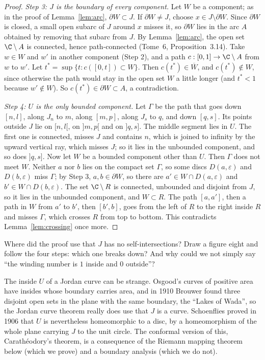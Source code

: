 \begin{proof}
\emph{Step 3: $J$ is the boundary of every component.} Let $W$ be a component; as in the proof of Lemma~\ref{lem:arc}, $\partial W\subset J$. If $\partial W\ne J$, choose $x\in J\setminus\partial W$.
Since $\partial W$ is closed, a small open subarc of $J$ around $x$ misses it, so $\partial W$ lies in the arc $A$ obtained by removing that subarc from $J$. By Lemma~\ref{lem:arc}, the open set
$\C\setminus A$ is connected, hence path-connected (Tome~6, Proposition~3.14). Take $w\in W$ and $w'$ in another component (Step 2), and a path $c:[0,1]\to\C\setminus A$ from $w$ to $w'$. Let
$t^*=\sup\{t:c([0,t])\subset W\}$. Then $c(t^*)\in\overline W$, and $c(t^*)\notin W$, since otherwise the path would stay in the open set $W$ a little longer (and $t^*<1$ because $w'\notin W$). So
$c(t^*)\in\partial W\subset A$, a contradiction.

\emph{Step 4: $U$ is the only bounded component.} Let $\Gamma$ be the path that goes down $[n,l]$, along $J_n$ to $m$, along $[m,p]$, along $J_s$ to $q$, and down $[q,s]$. Its points outside $J$
lie on $[n,l[$, on $]m,p[$ and on $]q,s]$. The middle segment lies in $U$. The first one is connected, misses $J$ and contains $n$, which is joined to infinity by the upward vertical ray, which misses
$J$; so it lies in the unbounded component, and so does $]q,s]$. Now let $W$ be a bounded component other than $U$. Then $\Gamma$ does not meet $W$. Neither $a$ nor $b$ lies on the compact
set $\Gamma$, so some discs $D(a,\varepsilon)$ and $D(b,\varepsilon)$ miss $\Gamma$; by Step 3, $a,b\in\partial W$, so there are $a'\in W\cap D(a,\varepsilon)$ and $b'\in W\cap D(b,\varepsilon)$. The set $\C\setminus R$ is
connected, unbounded and disjoint from $J$, so it lies in the unbounded component, and $W\subset R$. The path $[a,a']$, then a path in $W$ from $a'$ to $b'$, then $[b',b]$, goes from the left of
$R$ to the right inside $R$ and misses $\Gamma$, which crosses $R$ from top to bottom. This contradicts Lemma~\ref{lem:crossing} once more.
\end{proof}

\begin{think}
Where did the proof use that $J$ has no self-intersections? Draw a figure eight and follow the four steps: which one breaks down? And why could we not simply say ``the winding number is $1$
inside and $0$ outside''?
\end{think}

\begin{remark}
The inside $U$ of a Jordan curve can be strange. Osgood's curves of positive area have insides whose boundary carries area, and in 1910 Brouwer found three disjoint open sets in the plane
with the same boundary, the ``Lakes of Wada'', so the Jordan curve theorem really does use that $J$ is a curve. Schoenflies proved in 1906 that $U$ is nevertheless homeomorphic to a disc,
by a homeomorphism of the whole plane carrying $J$ to the unit circle. The conformal version of this, Carath\'eodory's theorem, is a consequence of the Riemann mapping theorem below
(which we prove) and a boundary analysis (which we do not).
\end{remark}

